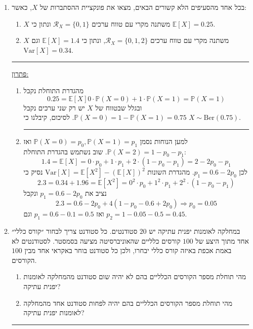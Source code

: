 \documentclass[12pt, a4paper]{article}
\newcommand{\cR}{\mathcal{R}}
\newcommand{\PP}{\mathbb{P}}
\newcommand{\Ber}{\mathrm{Ber}}
\newcommand{\Var}{\mathrm{Var}}
\newcommand{\EE}{\mathbb{E}}
\begin{document}
\begin{enumerate}
\begin{enumerate}
\end{enumerate}

\newpage
\item
בכל אחד מהסעיפים הלא קשורים הבאים, מצאו את פונקציית ההסתברות של
$X$,
 כאשר:
 \begin{enumerate}
\item
$X$
משתנה מקרי עם טווח ערכים
$\cR_X=\{0,1\}$
ונתון כי
$\EE[X]=0.25$.
\item
$X$
משתנה מקרי עם טווח ערכים
$\cR_X=\{0,1,2\}$,
ונתון כי
$\EE[X]=1.4$
וגם
$\Var[X]=0.34$.

\end{enumerate}
\noindent\rule{15cm}{0.4pt}

\underline{פתרון:}
\begin{enumerate}
\item
מהגדרת התוחלת נקבל
$$0.25=\EE[X]
0\cdot \PP(X=0)+1\cdot \PP(X=1)=\PP(X=1)$$
ובגלל שבטווח של
$X$
יש רק שני ערכים נקבל
$\PP(X=0)=1-\PP(X=1)=0.75$.
לסיכום, קיבלנו כי
$X\sim\Ber(0.75)$.

\noindent\rule{15cm}{0.4pt}


\item
למען הנוחות נסמן
$\PP(X=0)=p_0, \PP(X=1)=p_1$
ואז
$\PP(X=2)=1-p_0-p_1$.
שוב נשתמש בהגדרת התוחלת:
$$1.4=\EE[X]
=0\cdot p_0+1\cdot p_1+2\cdot (1-p_0-p_1)=2-2p_0-p_1$$
לכן
$p_1=0.6-2p_0$.
מהגדרת השונות
$\Var[X]=\EE[X^2]-(\EE[X])^2$
 נסיק כי
$$2.3=0.34+1.96=
\EE[X^2]=0^2\cdot p_0+1^2\cdot p_1
+2^2\cdot (1-p_0-p_1)$$
נציב את
$p_1=0.6-2p_0$
ונקבל
$$2.3=0.6-2p_0+4(1-p_0-0.6+2p_0)
\Longrightarrow
p_0=0.05$$
ואז
$p_1=0.6-0.1=0.5$ וגם
$p_2=1-0.05-0.5=0.45$.
\end{enumerate}
\newpage
\item
במחלקה לאומנות יפנית עתיקה יש
$20$
סטודנטים. כל סטודנט צריך לבחור ״קורס כללי״ אחד מתוך היצע של
$100$
קורסים כלליים שהאוניברסיטה מציעה בסמסטר.
לסטודנטים לא באמת אכפת באיזה קורס כללי יבחרו, ולכן כל סטודנט בוחר באקראי אחד מבין
$100$
הקורסים.
\begin{enumerate}
\item
מהי תוחלת מספר הקורסים הכלליים בהם לא יהיה שום סטודנט מהמחלקה לאומנות יפנית עתיקה?
\item
מהי תוחלת מספר הקורסים הכלליים בהם יהיה לפחות סטודנט אחד מהמחלקה לאומנות יפנית עתיקה?
\end{enumerate}

\noindent\rule{15cm}{0.4pt}


\end{enumerate}
\end{document}
